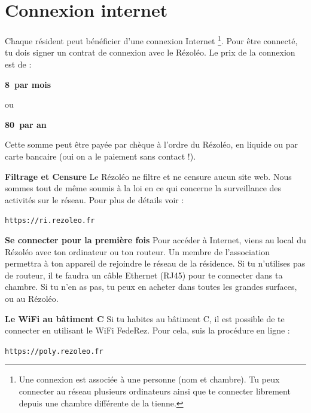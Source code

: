 \documentclass[12pt]{article}
\begin{document}
\section{Connexion internet}
  Chaque résident peut bénéficier d’une connexion Internet \footnote{Une connexion est associée à une personne (nom et chambre). Tu peux connecter au réseau plusieurs ordinateurs ainsi que te connecter librement depuis une chambre différente de la tienne.}. Pour être connecté, tu dois signer un contrat de connexion avec le Rézoléo. Le prix de la connexion est de :
  {\begin{center}
    \textbf{8\EUR~par mois}
  \end{center}
  \centerline{ou}
  \begin{center}
    \textbf{80\EUR~par an}
  \end{center}

  Cette somme peut être payée par chèque à l’ordre du Rézoléo, en liquide ou par carte bancaire (oui on a le paiement sans contact !).
  \begin{description}
    \item \textbf{Filtrage et Censure}\vspace*{0.5cm} \newline Le Rézoléo ne filtre et ne censure aucun site web. Nous sommes tout de même soumis à la loi en ce qui concerne la surveillance des activités sur le réseau. Pour plus de détails voir :
    \begin{center}
      \verb|https://ri.rezoleo.fr|
    \end{center}
    \item \textbf{Se connecter pour la première fois}\vspace*{0.5cm} \newline Pour accéder à Internet, viens au local du Rézoléo avec ton ordinateur ou ton routeur. Un membre de l’association permettra à ton appareil de rejoindre le réseau de la résidence. Si tu n'utilises pas de routeur, il te faudra un câble Ethernet (RJ45) pour te connecter dans ta chambre. Si tu n’en as pas, tu peux en acheter dans toutes les grandes surfaces, ou au Rézoléo.
    \item \textbf{Le WiFi au bâtiment C}\vspace*{0.5cm} \newline Si tu habites au bâtiment C, il est possible de te connecter en utilisant le WiFi FedeRez. Pour cela, suis la procédure en ligne :
    \begin{center}
      \verb|https://poly.rezoleo.fr|
    \end{center}


\end{description}}
\end{document}
